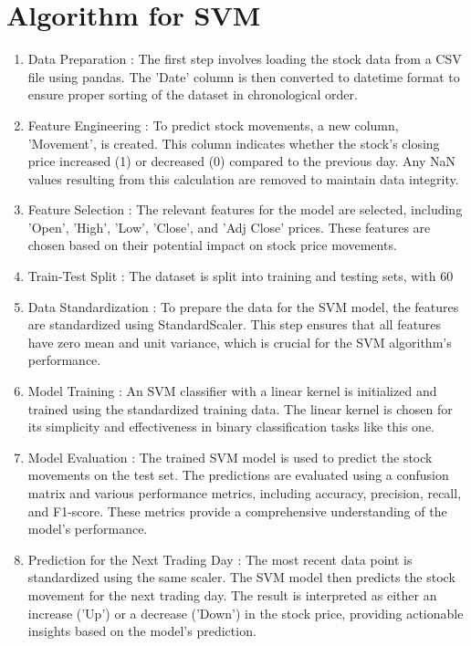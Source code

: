 \documentclass[12pt,a4paper]{report}
\begin{document}
\section{Algorithm for SVM }
\begin{enumerate}

\item Data Preparation :
The first step involves loading the stock data from a CSV file using pandas. The 'Date' column is then converted to datetime format to ensure proper sorting of the dataset in chronological order.

\item Feature Engineering :
To predict stock movements, a new column, 'Movement', is created. This column indicates whether the stock's closing price increased (1) or decreased (0) compared to the previous day. Any NaN values resulting from this calculation are removed to maintain data integrity.

\item Feature Selection :
The relevant features for the model are selected, including 'Open', 'High', 'Low', 'Close', and 'Adj Close' prices. These features are chosen based on their potential impact on stock price movements.

\item Train-Test Split :
The dataset is split into training and testing sets, with 60%

\item Data Standardization :
To prepare the data for the SVM model, the features are standardized using StandardScaler. This step ensures that all features have zero mean and unit variance, which is crucial for the SVM algorithm's performance.

\item Model Training :
An SVM classifier with a linear kernel is initialized and trained using the standardized training data. The linear kernel is chosen for its simplicity and effectiveness in binary classification tasks like this one.

\item Model Evaluation :
The trained SVM model is used to predict the stock movements on the test set. The predictions are evaluated using a confusion matrix and various performance metrics, including accuracy, precision, recall, and F1-score. These metrics provide a comprehensive understanding of the model's performance.

\item Prediction for the Next Trading Day :
The most recent data point is standardized using the same scaler. The SVM model then predicts the stock movement for the next trading day. The result is interpreted as either an increase ('Up') or a decrease ('Down') in the stock price, providing actionable insights based on the model's prediction.
\end{enumerate}
\newpage
\end{document}
